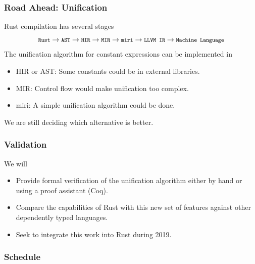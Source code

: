 \documentclass{beamer}
\newcommand{\code}[1] {\texttt{\footnotesize #1}}
\begin{document}
\begin{frame}[fragile]
    \frametitle{Road Ahead: Unification}
    Rust compilation has several stages
    $$\code{Rust} \rightarrow \code{AST} \rightarrow \code{HIR} \rightarrow \code{MIR} \rightarrow \code{miri} \rightarrow \code{LLVM IR} \rightarrow \code{Machine Language}$$
    The unification algorithm for constant expressions can be implemented in
    \begin{itemize}
        \item HIR or AST: Some constants could be in external libraries.
        \item MIR: Control flow would make unification too complex. 
        \item miri: A simple unification algorithm could be done.
    \end{itemize}
    We are still deciding which alternative is better.
\end{frame}

\begin{frame}[fragile]
    \frametitle{Validation}
    We will
    \begin{itemize}
        \item Provide formal verification of the unification algorithm either by hand or using a proof assistant (Coq).
        \item Compare the capabilities of Rust with this new set of features against other dependently typed languages.
        \item Seek to integrate this work into Rust during 2019.
    \end{itemize}
\end{frame}

\begin{frame}[fragile]
    \frametitle{Schedule}
\end{frame}
\end{document}

